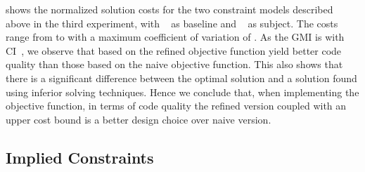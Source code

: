  shows the normalized
\gls{solution} costs for the two \glspl{constraint model} described above in the
third experiment, with ~\modelH{} as \gls{baseline}
and ~\modelI{} as \gls{subject}.
%
The costs range from
\printMinCycles{
  \ObjFunRefinedVsNaiveCyclesSpeedupNaiveWUbCyclesAvgMin,
  \ObjFunRefinedVsNaiveCyclesSpeedupRefinedWUbCyclesAvgMin
} to
\printMaxCycles{
  \ObjFunRefinedVsNaiveCyclesSpeedupNaiveWUbCyclesAvgMax,
  \ObjFunRefinedVsNaiveCyclesSpeedupRefinedWUbCyclesAvgMax
} with a maximum coefficient of variation of
\numMaxOf{
  \ObjFunRefinedVsNaiveCyclesSpeedupNaiveWUbCyclesCvMax,
  \ObjFunRefinedVsNaiveCyclesSpeedupRefinedWUbCyclesCvMax
}.
%
As the \gls{GMI} is \printGMI{%
  \ObjFunRefinedVsNaiveCyclesSpeedupRefinedVsNaiveWUbCyclesRegularSpeedupGmean%
} with \gls{CI}~\printGMICI{%
  \ObjFunRefinedVsNaiveCyclesSpeedupRefinedVsNaiveWUbCyclesRegularSpeedupCiMin%
}{%
  \ObjFunRefinedVsNaiveCyclesSpeedupRefinedVsNaiveWUbCyclesRegularSpeedupCiMax%
}, we observe that  based on the refined
\gls{objective function} yield better code quality than those based on the naive
\gls{objective function}.
%
This also shows that there is a significant difference between the optimal
\gls{solution} and a \gls{solution} found using inferior solving techniques.
%
Hence we conclude that, when implementing the \gls{objective function}, in terms
of code quality the refined version coupled with an upper cost bound is a better
design choice over naive version.


\subsection{Implied Constraints}



